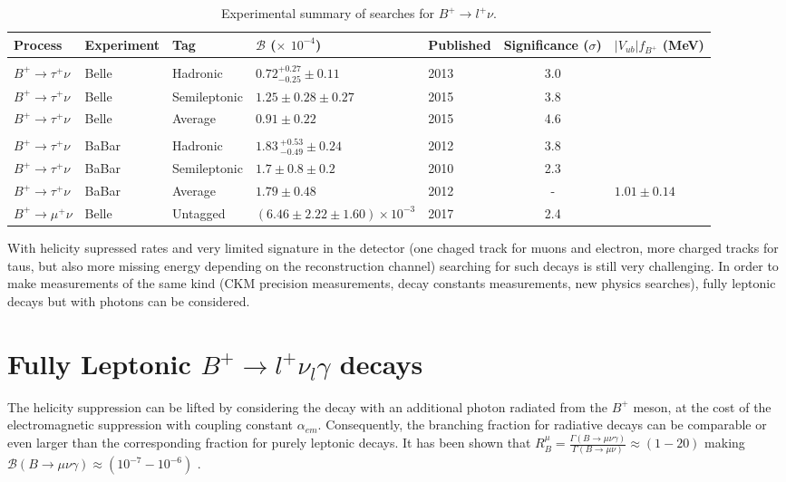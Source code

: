 \begin{table}[ht]
\begin{center}
\begin{tabular}{ l l l l H c H} \hline
	Process &Experiment & Tag &${\mathcal{B}}$ ($\times$ $10^{-4}$) & Published & Significance ($\sigma$) & {$|V_{ub}|f_{B^+}$ (MeV)} \hfill\\
\hline\\[-2.5ex]
	$B^{+}\rightarrow \tau^{+}\nu$	&Belle~\cite{Adachi:2012mm}&Hadronic&$0.72^{+0.27}_{-0.25}\pm0.11$  & 2013 & 3.0 \\ 
$B^{+}\rightarrow \tau^{+}\nu$	&Belle~\cite{Kronenbitter:2015kls}&Semileptonic&$1.25\pm0.28\pm0.27$ & 2015 & 3.8 \\
$B^{+}\rightarrow \tau^{+}\nu$	&Belle~\cite{Kronenbitter:2015kls}&Average&$0.91 \pm 0.22$ & 2015 & 4.6 \\\hline\\[-2.5ex]
$B^{+}\rightarrow \tau^{+}\nu$	&BaBar~\cite{Lees:2012ju} & Hadronic & $1.83\,^{+0.53}_{-0.49}\pm0.24$ & 2012 & 3.8 \\ 
$B^{+}\rightarrow \tau^{+}\nu$	&BaBar~\cite{Aubert:2009wt} & Semileptonic & $1.7\pm 0.8\pm 0.2$ & 2010 & 2.3\\ 
$B^{+}\rightarrow \tau^{+}\nu$	&BaBar~\cite{Lees:2012ju} & Average & $1.79 \pm 0.48$ & 2012 & - & $1.01\pm 0.14$  \\ \hline
$B^{+}\rightarrow \mu^{+}\nu$ & Belle~\cite{Sibidanov:2017vph} & Untagged& $(6.46\pm2.22\pm 1.60)\times 10^{-3}$ & 2017 & 2.4 &\\
\hline
\end{tabular}
\end{center}
\caption{Experimental summary of searches for $B^{+}\rightarrow l^{+}\nu$.}
\label{tab:sum}
\end{table}


With helicity supressed rates and very limited signature in the detector (one chaged track for muons and electron, more charged tracks for taus, but also more missing energy depending on the reconstruction channel) searching for such decays is still very challenging. In order to make measurements of the same kind (CKM precision measurements, decay constants measurements, new physics searches), fully leptonic decays but with photons can be considered.   

\section{Fully Leptonic $B^{+}\rightarrow l^{+} \nu_{l} \gamma$ decays}
The helicity suppression can be lifted by considering the decay with an additional photon radiated from the $B^{+}$ meson, at the cost of the electromagnetic suppression with coupling constant $\alpha_{em}$. Consequently, the branching fraction for radiative decays can be comparable or even larger than the corresponding fraction for purely leptonic decays. It has been shown that $R^{\mu}_{B}=\frac{\Gamma(B\rightarrow \mu \nu \gamma)}{\Gamma(B\rightarrow \mu \nu)}\approx(1-20)$ making $\mathcal{B}(B\rightarrow \mu \nu \gamma)\approx(10^{-7}-10^{-6})$ \cite{Burdman:1994ip}.

